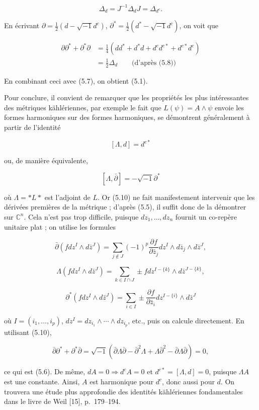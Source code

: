 \documentclass[
  french,
  a3paper,
  a3paper]{extarticle}
\begin{document}
\[\tag{5.8}\Delta_d=J^{-1}\Delta_dJ=\Delta_{d^c}.\]

En écrivant \(\partial=\frac12(d-\sqrt{-1}d^c)\),
\(\partial^*=\frac12(d^*-\sqrt{-1}d^c)\), on voit que

\[\begin{aligned}\partial\partial^*+\partial^*\partial&=\frac14(dd^*+d^*d+d^cd^{c*}+d^{c*}d^c)\\&=\frac12\Delta_d\qquad\text{(d’après (5.8))}\end{aligned}\]

En combinant ceci avec (5.7), on obtient (5.1).

Pour conclure, il convient de remarquer que les propriétés les plus
intéressantes des métriques kählériennes, par exemple le fait que
\(L(\psi)=A\wedge\psi\) envoie les formes harmoniques sur des formes
harmoniques, se démontrent généralement à partir de l'identité

\[\tag{5.9}[\Lambda,d]=d^{c*}\]

ou, de manière équivalente,

\[\tag{5.10}[\Lambda,\bar\partial]=-\sqrt{-1}\partial^*\]

où \(\Lambda=*L*\) est l'adjoint de \(L\). Or (5.10) ne fait
manifestement intervenir que les dérivées premières de la métrique ;
d'après (5.5), il suffit donc de la démontrer sur \(\mathbb C^n\). Cela
n'est pas trop difficile, puisque \(dz_1,\ldots,dz_n\) fournit un
co-repère unitaire plat ; on utilise les formules

\[\bar\partial(fdz^I\wedge d\bar z^J)=\sum_{j\notin J}(-1)^p\frac{\partial f}{\partial\bar z_j}dz^I\wedge d\bar z_j\wedge d\bar z^J,\]

\[\Lambda(fdz^I\wedge d\bar z^J)=\sum_{k\in I\cap J}\pm fdz^{I-\{k\}}\wedge d\bar z^{J-\{k\}},\]

\[\partial^*(fdz^I\wedge d\bar z^J)=\sum_{i\in I}\pm\frac{\partial f}{\partial\bar z_i}dz^{I-\{i\}}\wedge d\bar z^J\]

où \(I=(i_1,\ldots,i_p)\), \(dz^I=dz_{i_1}\wedge\cdots\wedge dz_{i_p}\),
etc., puis on calcule directement. En utilisant (5.10),

\[\bar\partial\partial^*+\partial^*\bar\partial=\sqrt{-1}(\bar\partial\Lambda\bar\partial-\bar\partial^2\Lambda+\Lambda\bar\partial^2-\bar\partial\Lambda\bar\partial)=0,\]

ce qui est (5.6). De même, \(dA=0\Rightarrow d^cA=0\) et
\(d^{c*}=[\Lambda,d]=0\), puisque \(\Lambda A\) est une constante.
Ainsi, \(A\) est harmonique pour \(d^c\), donc aussi pour \(d\). On
trouvera une étude plus approfondie des identités kählériennes
fondamentales dans le livre de Weil {[}15{]}, p.~179--194.
\end{document}
